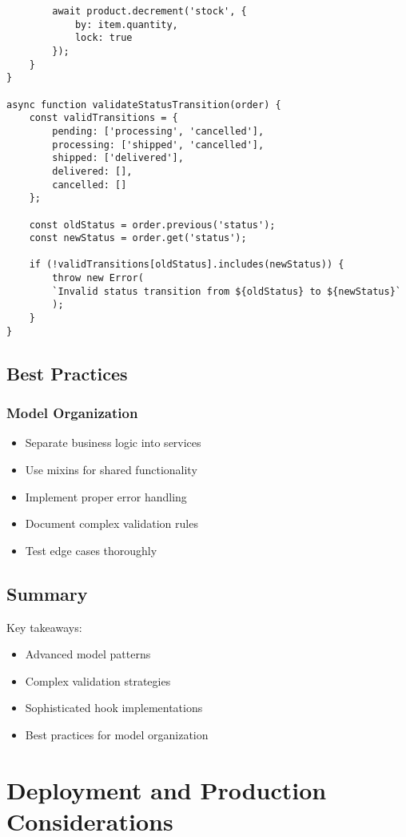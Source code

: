 \documentclass[12pt,a4paper]{book}
\begin{document}
\begin{verbatim}
		await product.decrement('stock', {
			by: item.quantity,
			lock: true
		});
	}
}

async function validateStatusTransition(order) {
	const validTransitions = {
		pending: ['processing', 'cancelled'],
		processing: ['shipped', 'cancelled'],
		shipped: ['delivered'],
		delivered: [],
		cancelled: []
	};
	
	const oldStatus = order.previous('status');
	const newStatus = order.get('status');
	
	if (!validTransitions[oldStatus].includes(newStatus)) {
		throw new Error(
		`Invalid status transition from ${oldStatus} to ${newStatus}`
		);
	}
}
	\end{verbatim}
	
	\section{Best Practices}
	
	\subsection{Model Organization}
	\begin{itemize}
		\item Separate business logic into services
		\item Use mixins for shared functionality
		\item Implement proper error handling
		\item Document complex validation rules
		\item Test edge cases thoroughly
	\end{itemize}
	
	\section{Summary}
	Key takeaways:
	\begin{itemize}
		\item Advanced model patterns
		\item Complex validation strategies
		\item Sophisticated hook implementations
		\item Best practices for model organization
	\end{itemize}
	
	\chapter{Deployment and Production Considerations}
	
\end{document}
